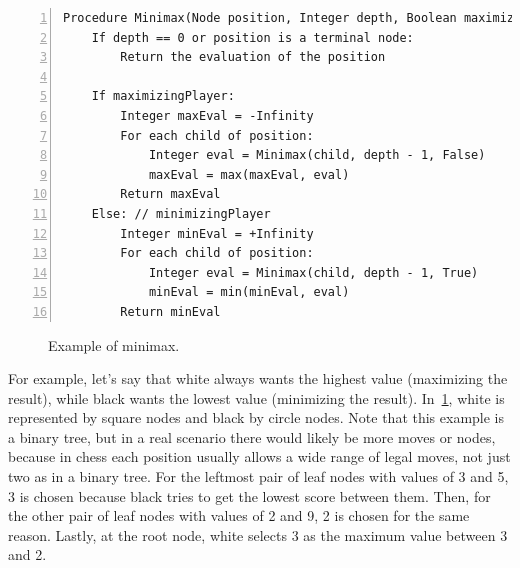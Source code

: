 \vspace{1em}

\begin{lstlisting}[caption={Pseudocode of the Minimax algorithm~\cite{Russell2021artificial}.}, label={lst:minimax}, frame=single, numbers=left, xleftmargin=15pt, breaklines=true, captionpos=b]
Procedure Minimax(Node position, Integer depth, Boolean maximizingPlayer):
    If depth == 0 or position is a terminal node:
        Return the evaluation of the position

    If maximizingPlayer:
        Integer maxEval = -Infinity
        For each child of position:
            Integer eval = Minimax(child, depth - 1, False)
            maxEval = max(maxEval, eval)
        Return maxEval
    Else: // minimizingPlayer
        Integer minEval = +Infinity
        For each child of position:
            Integer eval = Minimax(child, depth - 1, True)
            minEval = min(minEval, eval)
        Return minEval
\end{lstlisting}

\begin{figure}[H]
    \centering
    \caption{Example of minimax.}\label{fig:minimax}
\end{figure}

\noindent For example, let's say that white always wants the highest value (maximizing the result), while black wants the lowest value (minimizing the result). In~\cref{fig:minimax}, white is represented by square nodes and black by circle nodes. Note that this example is a binary tree, but in a real scenario there would likely be more moves or nodes, because in chess each position usually allows a wide range of legal moves, not just two as in a binary tree. For the leftmost pair of leaf nodes with values of 3 and 5, 3 is chosen because black tries to get the lowest score between them. Then, for the other pair of leaf nodes with values of 2 and 9, 2 is chosen for the same reason. Lastly, at the root node, white selects 3 as the maximum value between 3 and 2.

